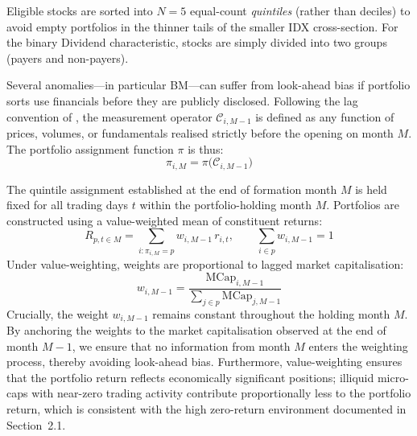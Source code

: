 \documentclass[
	a4paper,
	10pt,
	twoside,
]{LTJournalArticle}
\begin{document}
Eligible stocks are sorted into $N = 5$ equal-count \textit{quintiles} (rather than deciles) to avoid empty portfolios in the thinner tails of the smaller IDX cross-section. For the binary Dividend characteristic, stocks are simply divided into two groups (payers and non-payers).

Several anomalies---in particular BM---can suffer from look-ahead bias if portfolio sorts use financials before they are publicly disclosed. Following the lag convention of \citet{fama1993}, the measurement operator $\mathcal{C}_{i, M-1}$ is defined as any function of prices, volumes, or fundamentals realised strictly before the opening on month $M$. The portfolio assignment function $\pi$ is thus:
\begin{equation}
    \pi_{i, M} = \pi\!\big(\mathcal{C}_{i, M-1}\big)
\end{equation}

The quintile assignment established at the end of formation month $M$ is held fixed for all trading days $t$ within the portfolio-holding month $M$. Portfolios are constructed using a value-weighted mean of constituent returns:
\begin{equation}
    R_{p,t \in M} = \sum_{i : \pi_{i, M} = p} w_{i, M-1} \, r_{i,t}, \qquad \sum_{i \in p} w_{i, M-1} = 1
\end{equation}
Under value-weighting, weights are proportional to lagged market capitalisation:
\begin{equation}
    w_{i, M-1} = \frac{\text{MCap}_{i, M-1}}{\sum_{j \in p} \text{MCap}_{j, M-1}}
\end{equation}
Crucially, the weight $w_{i, M-1}$ remains constant throughout the holding month $M$. By anchoring the weights to the market capitalisation observed at the end of month $M{-}1$, we ensure that no information from month $M$ enters the weighting process, thereby avoiding look-ahead bias. Furthermore, value-weighting ensures that the portfolio return reflects economically significant positions; illiquid micro-caps with near-zero trading activity contribute proportionally less to the portfolio return, which is consistent with the high zero-return environment documented in Section~2.1.
\end{document}
